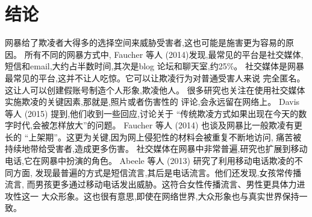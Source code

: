 \documentclass[a4paper]{article}
\begin{document}
\section{结论}
网暴给了欺凌者大得多的选择空间来威胁受害者,这也可能是施害更为容易的原因。
所有不同的网暴方式中,
Faucher 等人 (2014)\cite{faucher2014}发现,最常见的平台是社交媒体,
短信和email,大约占半数时间,其次是blog 论坛和聊天室,约25\%。
社交媒体是网暴最常见的平台,这并不让人吃惊。它可以让欺凌行为对普通受害人来说
完全匿名。这让人可以创建假账号制造个人形象,欺凌他人。
很多研究也关注在使用社交媒体实施欺凌的关键因素,那就是,照片或者伤害性的
评论,会永远留在网络上。
Davis 等人 (2015)\cite{davis2015} 提到,他们收到一些回应,讨论关于
``传统欺凌方式如果出现在今天的数字时代,会被怎样放大''的问题。
Faucher 等人 (2014)\cite{faucher2014} 也谈及网暴比一般欺凌有更长的
``上架期''。这更为关键,因为网上侵犯性的材料会被重复不断地访问,
痛苦被持续地带给受害者,造成更多伤害。
社交媒体在网暴中非常普遍,研究也扩展到移动电话,它在网暴中扮演的角色。
Abeele 等人 (2013)\cite{abeele2013} 研究了利用移动电话欺凌的不同方面,
发现最普遍的方式是短信流言,其后是电话流言。他们还发现,女孩常传播流言,
而男孩更多通过移动电话发出威胁。这符合女性传播流言、男性更具体力进攻性这一
大众形象。这也很有意思,即使在网络世界,大众形象也与真实世界保持一致。



\end{document}

